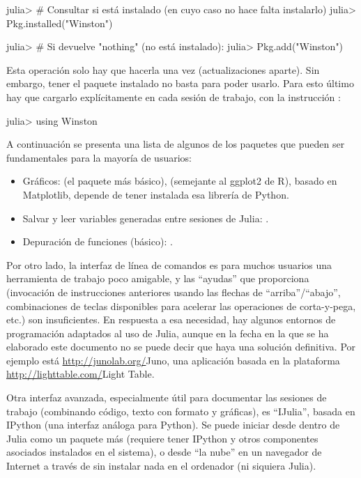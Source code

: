 \begin{jlconcode}
julia> # Consultar si está instalado (en cuyo caso no hace falta instalarlo)
julia> Pkg.installed("Winston")

julia> # Si devuelve "nothing" (no está instalado):
julia> Pkg.add("Winston")
\end{jlconcode}

Esta operación solo hay que hacerla una vez (actualizaciones aparte). Sin embargo, tener el paquete instalado no basta para poder usarlo. Para esto último hay que cargarlo explícitamente en cada sesión de trabajo, con la instrucción :

\begin{jlconcode}
julia> using Winston
\end{jlconcode}

A continuación se presenta una lista de algunos de los paquetes que pueden ser fundamentales para la mayoría de usuarios:

\begin{itemize}
  \item Gráficos:  (el paquete más básico),  (semejante al ggplot2 de R),  basado en Matplotlib, depende de tener instalada esa librería de Python.
  \item Salvar y leer variables generadas entre sesiones de Julia: .
  \item Depuración de funciones (básico): .
\end{itemize}

Por otro lado, la interfaz de línea de comandos es para muchos usuarios una herramienta de trabajo poco amigable, y las ``ayudas'' que proporciona (invocación de instrucciones anteriores usando las flechas de ``arriba''/``abajo'', combinaciones de teclas disponibles para acelerar las operaciones de corta-y-pega, etc.) son insuficientes. En respuesta a esa necesidad, hay algunos entornos de programación adaptados al uso de Julia, aunque en la fecha en la que se ha elaborado este documento no se puede decir que haya una solución definitiva. Por ejemplo está \url{http://junolab.org/}{Juno}, una aplicación basada en la plataforma \url{http://lighttable.com/}{Light Table}.

Otra interfaz avanzada, especialmente útil para documentar las sesiones de trabajo (combinando código, texto con formato y gráficas), es ``IJulia'', basada en IPython (una interfaz análoga para Python). Se puede iniciar desde dentro de Julia como un paquete más (requiere tener IPython y otros componentes asociados instalados en el sistema), o desde ``la nube'' en un navegador de Internet a través de  sin instalar nada en el ordenador (ni siquiera Julia).

